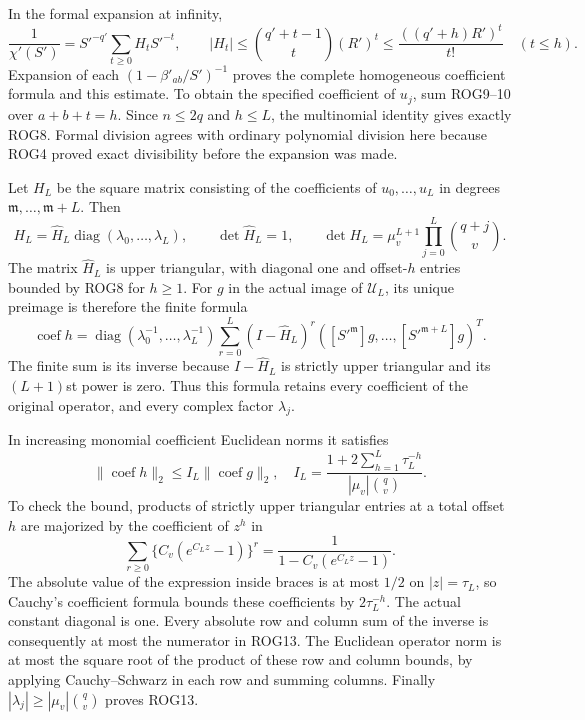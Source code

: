 \documentclass[11pt,a4paper]{article}
\begin{document}
In the formal expansion at infinity,
\[
 \frac1{\chi'(S')}=S'^{-q'}\sum_{t\ge0}H_tS'^{-t},\qquad
 |H_t|\le\binom{q'+t-1}{t}(R')^t
       \le\frac{((q'+h)R')^t}{t!}\quad(t\le h).
 \tag{ROG10}
\]
Expansion of each $(1-\beta'_{ab}/S')^{-1}$ proves the
complete homogeneous coefficient formula and this estimate.
To obtain the specified coefficient of $u_j$, sum ROG9--10
over $a+b+t=h$. Since $n\le2q$ and $h\le L$, the
multinomial identity gives exactly ROG8. Formal division
agrees with ordinary polynomial division here because ROG4
proved exact divisibility before the expansion was made.

Let $H_L$ be the square matrix consisting of the coefficients
of $u_0,\ldots,u_L$ in degrees $\mathfrak m,\ldots,\mathfrak m+L$. Then
\[
 H_L=\widehat H_L\operatorname{diag}(\lambda_0,\ldots,\lambda_L),
 \qquad \det\widehat H_L=1,
 \qquad \det H_L=\mu_v^{L+1}\prod_{j=0}^L\binom{q+j}{v}.
 \tag{ROG11}
\]
The matrix $\widehat H_L$ is upper triangular, with diagonal
one and offset-$h$ entries bounded by ROG8 for $h\ge1$.
For $g$ in the actual image of $\mathcal U_L$, its unique
preimage is therefore the finite formula
\[
 \operatorname{coef}h=
 \operatorname{diag}(\lambda_0^{-1},\ldots,\lambda_L^{-1})
 \sum_{r=0}^L(I-\widehat H_L)^r
          ([S'^{\mathfrak m}]g,\ldots,[S'^{\mathfrak m+L}]g)^T.
 \tag{ROG12}
\]
The finite sum is its inverse because $I-\widehat H_L$ is
strictly upper triangular and its $(L+1)$st power is zero.
Thus this formula retains every coefficient of the original
operator, and every complex factor $\lambda_j$.

In increasing monomial coefficient Euclidean norms it satisfies
\[
 \|\operatorname{coef}h\|_2\le I_L\|\operatorname{coef}g\|_2,
 \quad
 I_L=\frac{1+2\sum_{h=1}^L\tau_L^{-h}}
                {|\mu_v|\binom qv}.
 \tag{ROG13}
\]
To check the bound, products of strictly upper triangular
entries at a total offset $h$ are majorized by the coefficient
of $z^h$ in
\[
 \sum_{r\ge0}\{C_v(e^{C_Lz}-1)\}^r
       =\frac1{1-C_v(e^{C_Lz}-1)}.
 \tag{ROG14}
\]
The absolute value of the expression inside braces is at most
$1/2$ on $|z|=\tau_L$, so Cauchy's coefficient formula bounds
these coefficients by $2\tau_L^{-h}$. The actual constant
diagonal is one. Every absolute row and column sum of the
inverse is consequently at most the numerator in ROG13.
The Euclidean operator norm is at most the square root of
the product of these row and column bounds, by applying
Cauchy--Schwarz in each row and summing columns. Finally
$|\lambda_j|\ge|\mu_v|\binom qv$ proves ROG13.
\end{document}
